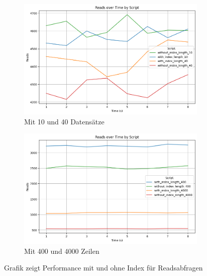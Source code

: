 \begin{figure}[H]
    \centering
    \begin{subfigure}[t]{0.48\textwidth}
        \centering
        \includegraphics[width=\textwidth]{PNGs/Script/Index/B_Tree/low-count/Reads}
        \caption{Mit 10 und 40 Datensätze}
        \label{indexing-b-tree-low-reads}
    \end{subfigure}
    \hfill
    \begin{subfigure}[t]{0.48\textwidth}
        \centering
        \includegraphics[width=\textwidth]{PNGs/Script/Index/B_Tree/high-count/Reads}
        \caption{Mit 400 und 4000 Zeilen}
        \label{indexing-b-tree-high-reads}
    \end{subfigure}
    \caption[B-Tree-Indexing: Mit Index vs Ohne]{Grafik zeigt Performance mit und ohne Index für Readsabfragen}
    \label{fig:indexing-vs-no}
\end{figure}
\vspace{-15pt}

